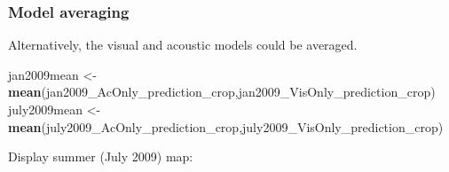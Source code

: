 \documentclass[11pt,]{article}
\newenvironment{Shaded}{\begin{snugshade}}{\end{snugshade}}
\newcommand{\KeywordTok}[1]{\textcolor[rgb]{0.13,0.29,0.53}{\textbf{{#1}}}}
\newcommand{\StringTok}[1]{\textcolor[rgb]{0.31,0.60,0.02}{{#1}}}
\newcommand{\NormalTok}[1]{{#1}}
\begin{document}
\subsubsection{Model averaging}\label{model-averaging}

Alternatively, the visual and acoustic models could be averaged.

\begin{Shaded}
\begin{Highlighting}[]
\NormalTok{jan2009mean <-}\StringTok{ }\KeywordTok{mean}\NormalTok{(jan2009_AcOnly_prediction_crop,jan2009_VisOnly_prediction_crop)}
\NormalTok{july2009mean <-}\StringTok{ }\KeywordTok{mean}\NormalTok{(july2009_AcOnly_prediction_crop,july2009_VisOnly_prediction_crop)}
\end{Highlighting}
\end{Shaded}

Display summer (July 2009) map:
\end{document}
